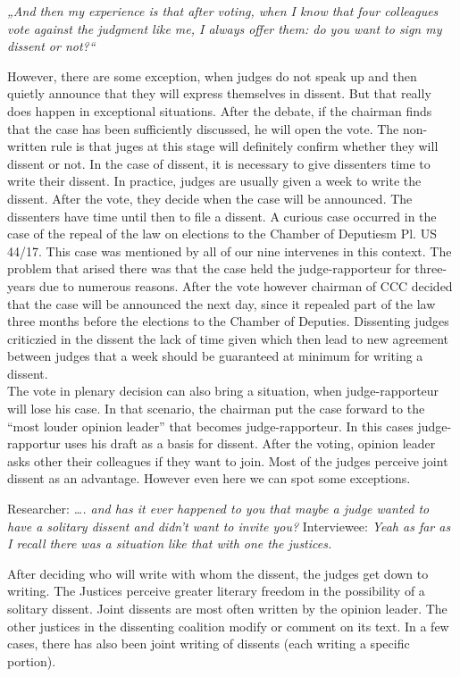 \documentclass[
  11pt,
]{article}
\begin{document}
\emph{„And then my experience is that after voting, when I know that
four colleagues vote against the judgment like me, I always offer them:
do you want to sign my dissent or not?{}``}

However, there are some exception, when judges do not speak up and then
quietly announce that they will express themselves in dissent. But that
really does happen in exceptional situations. After the debate, if the
chairman finds that the case has been sufficiently discussed, he will
open the vote. The non-written rule is that juges at this stage will
definitely confirm whether they will dissent or not. In the case of
dissent, it is necessary to give dissenters time to write their dissent.
In practice, judges are usually given a week to write the dissent. After
the vote, they decide when the case will be announced. The dissenters
have time until then to file a dissent. A curious case occurred in the
case of the repeal of the law on elections to the Chamber of Deputiesm
Pl. US 44/17. This case was mentioned by all of our nine intervenes in
this context. The problem that arised there was that the case held the
judge-rapporteur for three-years due to numerous reasons. After the vote
however chairman of CCC decided that the case will be announced the next
day, since it repealed part of the law three months before the elections
to the Chamber of Deputies. Dissenting judges criticzied in the dissent
the lack of time given which then lead to new agreement between judges
that a week should be guaranteed at minimum for writing a dissent.\\
The vote in plenary decision can also bring a situation, when
judge-rapporteur will lose his case. In that scenario, the chairman put
the case forward to the ``most louder opinion leader'' that becomes
judge-rapporteur. In this cases judge-rapportur uses his draft as a
basis for dissent. After the voting, opinion leader asks other their
colleagues if they want to join. Most of the judges perceive joint
dissent as an advantage. However even here we can spot some exceptions.

Researcher: \emph{\ldots. and has it ever happened to you that maybe a
judge wanted to have a solitary dissent and didn't want to invite you?}
Interviewee: \emph{Yeah as far as I recall there was a situation like
that with one the justices.}

After deciding who will write with whom the dissent, the judges get down
to writing. The Justices perceive greater literary freedom in the
possibility of a solitary dissent. Joint dissents are most often written
by the opinion leader. The other justices in the dissenting coalition
modify or comment on its text. In a few cases, there has also been joint
writing of dissents (each writing a specific portion).
\end{document}
